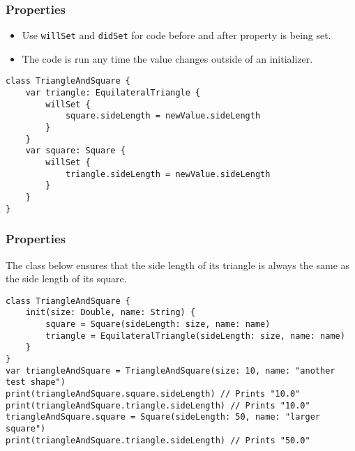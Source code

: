 \begin{frame}[fragile] \frametitle{Properties}

\begin{itemize}
\item Use \lstinline|willSet| and \lstinline|didSet| for code before and after property is being set.
\item The code is run any time the value changes outside of an initializer.
\end{itemize}

\begin{lstlisting}
class TriangleAndSquare {
    var triangle: EquilateralTriangle {
        willSet {
            square.sideLength = newValue.sideLength
        }
    }
    var square: Square {
        willSet {
            triangle.sideLength = newValue.sideLength
        }
    }
}
\end{lstlisting}
\end{frame}


\begin{frame}[fragile] \frametitle{Properties}

The class below ensures that the side length of its triangle is always the same as the side length of its square.

\begin{lstlisting}
class TriangleAndSquare {
    init(size: Double, name: String) {
        square = Square(sideLength: size, name: name)
        triangle = EquilateralTriangle(sideLength: size, name: name)
    }
}
var triangleAndSquare = TriangleAndSquare(size: 10, name: "another test shape")
print(triangleAndSquare.square.sideLength) // Prints "10.0"
print(triangleAndSquare.triangle.sideLength) // Prints "10.0"
triangleAndSquare.square = Square(sideLength: 50, name: "larger square")
print(triangleAndSquare.triangle.sideLength) // Prints "50.0"
\end{lstlisting}


\end{frame}


